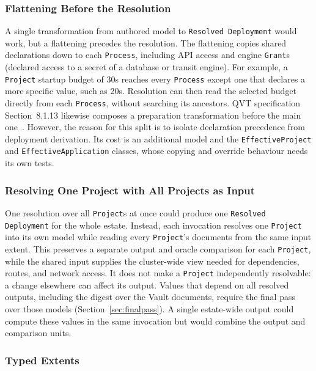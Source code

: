 \subsubsection{Flattening Before the Resolution}
\label{sec:twotransformations}

A single transformation from authored model to \texttt{Resolved Deployment}
would work, but a flattening precedes the resolution. The flattening copies
shared declarations down to each \texttt{Process}, including API access and engine \texttt{Grant}s (declared access to a secret of a database or transit engine). For example, a
\texttt{Project} startup budget of 30s reaches every \texttt{Process}
except one that declares a more specific value, such as 20s. Resolution can
then read the selected budget directly from each \texttt{Process}, without
searching its ancestors. QVT specification Section~8.1.13 likewise composes
a preparation transformation before the main one~\cite{qvt13}. However, the
reason for this split is to isolate declaration precedence from deployment derivation. Its cost is an additional model and
the \texttt{EffectiveProject} and \texttt{EffectiveApplication} classes,
whose copying and override behaviour needs its own tests.

\subsubsection{Resolving One Project with All Projects as Input}
\label{sec:perproject}

One resolution over all \texttt{Project}s at once could produce one
\texttt{Resolved Deployment} for the whole estate. Instead, each invocation
resolves one \texttt{Project} into its own model while reading every
\texttt{Project}'s documents from the same input extent. This preserves a
separate output and oracle comparison for each \texttt{Project}, while the
shared input supplies the cluster-wide view needed for dependencies, routes,
and network access. It does not make a \texttt{Project} independently
resolvable: a change elsewhere can affect its output. Values that depend on
all resolved outputs, including the digest over the Vault documents, require
the final pass over those models (Section~\ref{sec:finalpass}). A single
estate-wide output could compute these values in the same invocation but
would combine the output and comparison units.

\subsubsection{Typed Extents}
\label{sec:extentsalternative}


